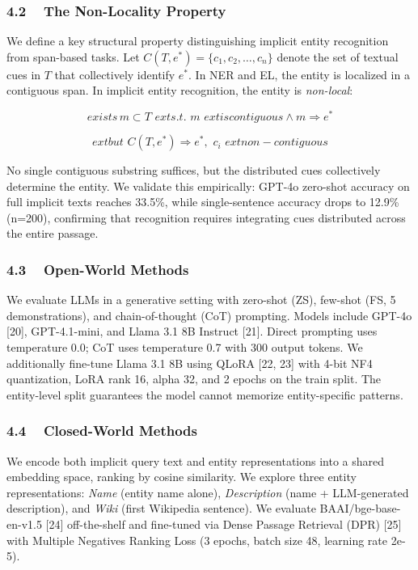 ﻿\documentclass{article}
\begin{document}
\subsubsection{4.2 ~ The Non-Locality
Property}\label{the-non-locality-property}

We define a key structural property distinguishing implicit entity
recognition from span-based tasks. Let
\(C\left( T,e^{*} \right) = \{ c_{1},c_{2},\ldots,c_{n}\}\) denote the
set of textual cues in \(T\) that collectively identify \(e^{*}\). In
NER and EL, the entity is localized in a contiguous span. In implicit
entity recognition, the entity is \emph{non-local}:

\[exists\, m \subset T\mspace{6mu} exts.t.\mspace{6mu} m\mspace{6mu} extiscontiguous \land m \Rightarrow e^{*}\]

\[extbut\mspace{6mu} C\left( T,e^{*} \right) \Rightarrow e^{*},\mspace{6mu} c_{i}\mspace{6mu} extnon - contiguous\]

No single contiguous substring suffices, but the distributed cues
collectively determine the entity. We validate this empirically: GPT-4o
zero-shot accuracy on full implicit texts reaches 33.5\%, while
single-sentence accuracy drops to 12.9\% (n=200), confirming that
recognition requires integrating cues distributed across the entire
passage.

\subsubsection{4.3 ~ Open-World Methods}\label{open-world-methods}

We evaluate LLMs in a generative setting with zero-shot (ZS), few-shot
(FS, 5 demonstrations), and chain-of-thought (CoT) prompting. Models
include GPT-4o {[}20{]}, GPT-4.1-mini, and Llama 3.1 8B Instruct
{[}21{]}. Direct prompting uses temperature 0.0; CoT uses temperature
0.7 with 300 output tokens. We additionally fine-tune Llama 3.1 8B using
QLoRA {[}22, 23{]} with 4-bit NF4 quantization, LoRA rank 16, alpha 32,
and 2 epochs on the train split. The entity-level split guarantees the
model cannot memorize entity-specific patterns.

\subsubsection{4.4 ~ Closed-World Methods}\label{closed-world-methods}

We encode both implicit query text and entity representations into a
shared embedding space, ranking by cosine similarity. We explore three
entity representations: \emph{Name} (entity name alone),
\emph{Description} (name + LLM-generated description), and \emph{Wiki}
(first Wikipedia sentence). We evaluate BAAI/bge-base-en-v1.5 {[}24{]}
off-the-shelf and fine-tuned via Dense Passage Retrieval (DPR) {[}25{]}
with Multiple Negatives Ranking Loss (3 epochs, batch size 48, learning
rate 2e-5).
\end{document}
